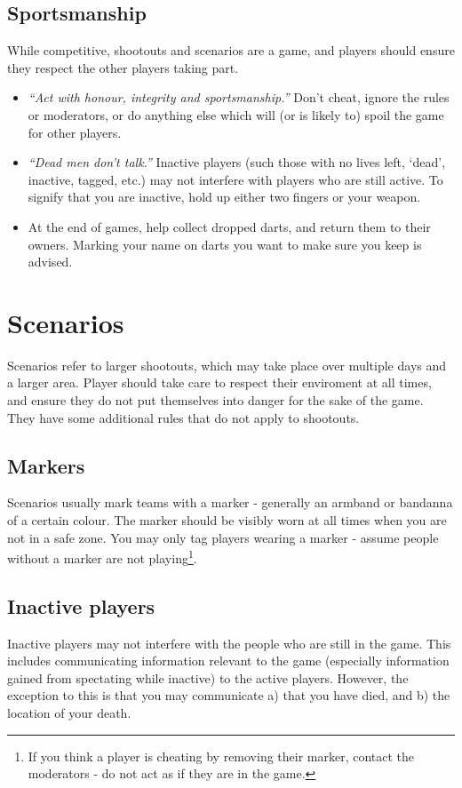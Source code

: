 \documentclass{article}
\begin{document}
	\subsection{Sportsmanship}
		While competitive, shootouts and scenarios are a game, and players should ensure they respect the other players taking part.
	
		\begin{itemize}
			\item {\em ``Act with honour, integrity and sportsmanship.''} Don't cheat, ignore the rules or moderators, or do anything else which will (or is likely to) spoil the game for other players.
			
			\item {\em ``Dead men don't talk.''} Inactive players (such those with no lives left, `dead', inactive, tagged, etc.) may not interfere with players who are still active. To signify that you are inactive, hold up either two fingers or your weapon. 
			
			\item At the end of games, help collect dropped darts, and return them to their owners. Marking your name on darts you want to make sure you keep is advised.
		\end{itemize}

\newpage
\section{Scenarios}
	Scenarios refer to larger shootouts, which may take place over multiple days and a larger area. Player should take care to respect their enviroment at all times, and ensure they do not put themselves into danger for the sake of the game. They have some additional rules that do not apply to shootouts.
	
	\subsection{Markers}
		
		Scenarios usually mark teams with a marker - generally an armband or bandanna of a certain colour. The marker should be visibly worn at all times when you are not in a safe zone. You may only tag players wearing a marker - assume people without a marker are not playing\footnote{If you think a player is cheating by removing their marker, contact the moderators - do not act as if they are in the game.}.
	
	\subsection{Inactive players}
		Inactive players may not interfere with the people who are still in the game. This includes communicating information relevant to the game (especially information gained from spectating while inactive) to the active players. However, the exception to this is that you may communicate a) that you have died, and b) the location of your death.
	
\end{document}
